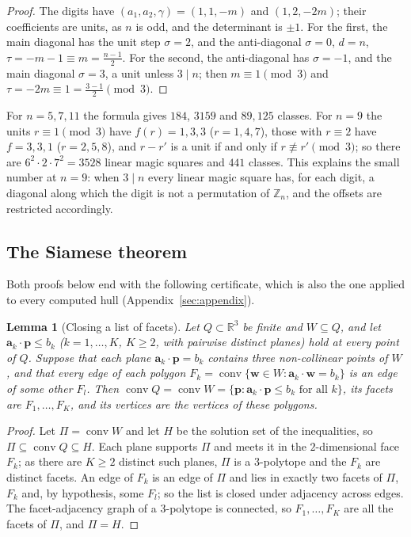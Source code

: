 \documentclass[11pt,a4paper]{article}
\theoremstyle{plain}
\newtheorem{lemma}[theorem]{Lemma}
\theoremstyle{definition}
\theoremstyle{remark}
\newcommand{\R}{\mathbb{R}}
\newcommand{\Z}{\mathbb{Z}}
\begin{document}
\begin{proof}
The digits have $(a_1,a_2,\gamma)=(1,1,-m)$ and $(1,2,-2m)$; their coefficients are units, as $n$ is odd, and the determinant is $\pm1$.
For the first, the main diagonal has the unit step $\sigma=2$, and the anti-diagonal $\sigma=0$, $d=n$, $\tau=-m-1\equiv m=\frac{n-1}2$.
For the second, the anti-diagonal has $\sigma=-1$, and the main diagonal $\sigma=3$, a unit unless $3\mid n$; then $m\equiv1\pmod 3$ and $\tau=-2m\equiv1=\frac{3-1}2\pmod3$.
\end{proof}

For $n=5,7,11$ the formula gives $184$, $3159$ and $89{,}125$ classes.
For $n=9$ the units $r\equiv1\pmod3$ have $f(r)=1,3,3$ ($r=1,4,7$), those with $r\equiv2$ have $f=3,3,1$ ($r=2,5,8$), and $r-r'$ is a unit if and only if $r\not\equiv r'\pmod 3$; so there are $6^2\cdot2\cdot7^2=3528$ linear magic squares and $441$ classes.
This explains the small number at $n=9$: when $3\mid n$ every linear magic square has, for each digit, a diagonal along which the digit is not a permutation of $\Z_n$, and the offsets are restricted accordingly.

\subsection{The Siamese theorem}

Both proofs below end with the following certificate, which is also the one applied to every computed hull (Appendix~\ref{sec:appendix}).

\begin{lemma}[Closing a list of facets]
\label{lem:closing}
Let $Q\subset\R^3$ be finite and $W\subseteq Q$, and let $\mathbf a_k\cdot\mathbf p\le b_k$ ($k=1,\dots,K$, $K\ge2$, with pairwise distinct planes) hold at every point of $Q$.
Suppose that each plane $\mathbf a_k\cdot\mathbf p=b_k$ contains three non-collinear points of $W$, and that every edge of each polygon $F_k=\operatorname{conv}\{\mathbf w\in W:\mathbf a_k\cdot\mathbf w=b_k\}$ is an edge of some other $F_l$.
Then $\operatorname{conv}Q=\operatorname{conv}W=\{\mathbf p:\mathbf a_k\cdot\mathbf p\le b_k\text{ for all }k\}$, its facets are $F_1,\dots,F_K$, and its vertices are the vertices of these polygons.
\end{lemma}

\begin{proof}
Let $\Pi=\operatorname{conv}W$ and let $H$ be the solution set of the inequalities, so $\Pi\subseteq\operatorname{conv}Q\subseteq H$.
Each plane supports $\Pi$ and meets it in the $2$-dimensional face $F_k$; as there are $K\ge2$ distinct such planes, $\Pi$ is a $3$-polytope and the $F_k$ are distinct facets.
An edge of $F_k$ is an edge of $\Pi$ and lies in exactly two facets of $\Pi$, $F_k$ and, by hypothesis, some $F_l$; so the list is closed under adjacency across edges.
The facet-adjacency graph of a $3$-polytope is connected, so $F_1,\dots,F_K$ are all the facets of $\Pi$, and $\Pi=H$.
\end{proof}
\end{document}
